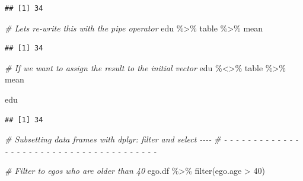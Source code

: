 \documentclass[
]{book}
\newenvironment{Shaded}{\begin{snugshade}}{\end{snugshade}}
\newcommand{\CommentTok}[1]{\textcolor[rgb]{0.56,0.35,0.01}{\textit{#1}}}
\newcommand{\DecValTok}[1]{\textcolor[rgb]{0.00,0.00,0.81}{#1}}
\newcommand{\FunctionTok}[1]{\textcolor[rgb]{0.00,0.00,0.00}{#1}}
\newcommand{\NormalTok}[1]{#1}
\newcommand{\SpecialCharTok}[1]{\textcolor[rgb]{0.00,0.00,0.00}{#1}}
\begin{document}
\begin{verbatim}
## [1] 34
\end{verbatim}

\begin{Shaded}
\begin{Highlighting}[]
\CommentTok{\# Let\textquotesingle{}s re{-}write this with the pipe operator}
\NormalTok{edu }\SpecialCharTok{\%\textgreater{}\%}
\NormalTok{  table }\SpecialCharTok{\%\textgreater{}\%}
\NormalTok{  mean}
\end{Highlighting}
\end{Shaded}

\begin{verbatim}
## [1] 34
\end{verbatim}

\begin{Shaded}
\begin{Highlighting}[]
\CommentTok{\# If we want to assign the result to the initial vector}
\NormalTok{edu }\SpecialCharTok{\%\textless{}\textgreater{}\%}
\NormalTok{  table }\SpecialCharTok{\%\textgreater{}\%}
\NormalTok{  mean}

\NormalTok{edu}
\end{Highlighting}
\end{Shaded}

\begin{verbatim}
## [1] 34
\end{verbatim}

\begin{Shaded}
\begin{Highlighting}[]
\CommentTok{\# Subsetting data frames with dplyr: filter and select                      {-}{-}{-}{-}}
\CommentTok{\# {-} {-} {-} {-} {-} {-} {-} {-} {-} {-} {-} {-} {-} {-} {-} {-} {-} {-} {-} {-} {-} {-} {-} {-} {-} {-} {-} {-} {-} {-} {-} {-} {-} {-} {-} {-} {-} {-} {-} }

\CommentTok{\# Filter to egos who are older than 40}
\NormalTok{ego.df }\SpecialCharTok{\%\textgreater{}\%}
  \FunctionTok{filter}\NormalTok{(ego.age }\SpecialCharTok{\textgreater{}} \DecValTok{40}\NormalTok{)}
\end{Highlighting}
\end{Shaded}
\end{document}
